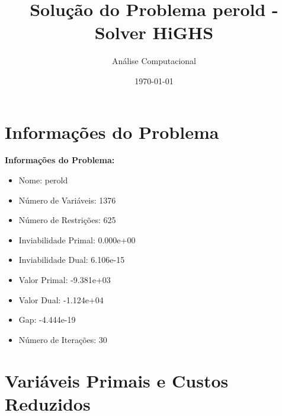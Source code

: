 \documentclass[12pt]{article}
\title{Solução do Problema perold - Solver HiGHS}
\author{Análise Computacional}
\date{\today}
\begin{document}
\maketitle

\section{Informações do Problema}

\textbf{Informações do Problema:}
\begin{itemize}
\item Nome: perold
\item Número de Variáveis: 1376
\item Número de Restrições: 625
\item Inviabilidade Primal: 0.000e+00
\item Inviabilidade Dual: 6.106e-15
\item Valor Primal: -9.381e+03
\item Valor Dual: -1.124e+04
\item Gap: -4.444e-19
\item Número de Iterações: 30
\end{itemize}


\section{Variáveis Primais e Custos Reduzidos}
\end{document}
